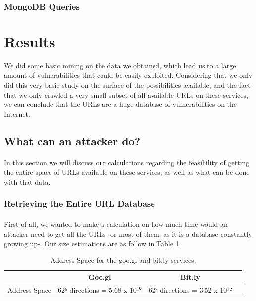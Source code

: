 \documentclass[12pt]{article}
\begin{document}
\subsubsection{MongoDB Queries}

\section{Results}

\paragraph{}
We did some basic mining on the data we obtained, which lead us to a large amount of vulnerabilities that could be easily exploited. Considering that we only did this very basic study on the surface of the possibilities available, and the fact that we only crawled a very small subset of all available URLs on these services, we can conclude that the URLs are a huge database of vulnerabilities on the Internet.

\subsection{What can an attacker do?}

\paragraph{}
In this section we will discuss our calculations regarding the feasibility of getting the entire space of URLs available on these services, as well as what can be done with that data.

\subsubsection{Retrieving the Entire URL Database}

\paragraph{}
First of all, we wanted to make a calculation on how much time would an attacker need to get all the URLs -or most of them, as it is a database constantly growing up-. Our size estimations are as follow in Table 1.

\begin{table}[h]
	\centering
		\begin{tabular}{ | l | c | c | c |}
 			\hline
			  & Goo.gl & Bit.ly \\ \hline
 			Address Space & 62⁶ directions = 5.68 x 10¹⁰ & 62⁷ directions = 3.52 x 10¹² \\
 			\hline
  		\end{tabular}
	\caption[A table]{Address Space for the goo.gl and bit.ly services.}
	\label{tab:albums}
\end{table}
\end{document}
